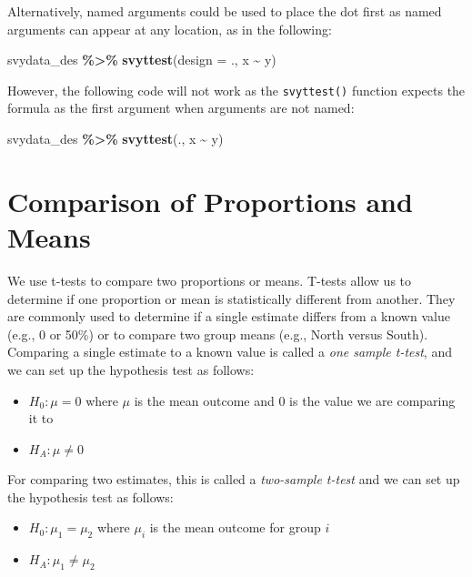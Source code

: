 \documentclass[
]{krantz}
\makeatletter
\newenvironment{Shaded}{\begin{snugshade}}{\end{snugshade}}
\newcommand{\AttributeTok}[1]{\textcolor[rgb]{0.27,0.27,0.27}{#1}}
\newcommand{\FunctionTok}[1]{\textcolor[rgb]{0.27,0.27,0.27}{\textbf{#1}}}
\newcommand{\NormalTok}[1]{#1}
\newcommand{\SpecialCharTok}[1]{\textcolor[rgb]{0.43,0.43,0.43}{\textbf{#1}}}
\providecommand{\tightlist}{%
  \setlength{\itemsep}{0pt}\setlength{\parskip}{0pt}}
\newenvironment{kframe}{%
\medskip{}
\setlength{\fboxsep}{.8em}
 \def\at@end@of@kframe{}%
 \ifinner\ifhmode%
  \def\at@end@of@kframe{\end{minipage}}%
  \begin{minipage}{\columnwidth}%
 \fi\fi%
 \def\FrameCommand##1{\hskip\@totalleftmargin \hskip-\fboxsep
 \colorbox{shadecolor}{##1}\hskip-\fboxsep
     \hskip-\linewidth \hskip-\@totalleftmargin \hskip\columnwidth}%
 \MakeFramed {\advance\hsize-\width
   \@totalleftmargin\z@ \linewidth\hsize
   \@setminipage}}%
 {\par\unskip\endMakeFramed%
 \at@end@of@kframe}
\renewenvironment{Shaded}{\begin{kframe}}{\end{kframe}}
\makeatother
\begin{document}
Alternatively, named arguments could be used to place the dot first as named arguments can appear at any location, as in the following:

\begin{Shaded}
\begin{Highlighting}[]
\NormalTok{svydata\_des }\SpecialCharTok{\%\textgreater{}\%}
 \FunctionTok{svyttest}\NormalTok{(}\AttributeTok{design =}\NormalTok{ ., x }\SpecialCharTok{\textasciitilde{}}\NormalTok{ y)}
\end{Highlighting}
\end{Shaded}

However, the following code will not work as the \texttt{svyttest()} function expects the formula as the first argument when arguments are not named:

\begin{Shaded}
\begin{Highlighting}[]
\NormalTok{svydata\_des }\SpecialCharTok{\%\textgreater{}\%}
 \FunctionTok{svyttest}\NormalTok{(., x }\SpecialCharTok{\textasciitilde{}}\NormalTok{ y)}
\end{Highlighting}
\end{Shaded}

\hypertarget{stattest-ttest}{%
\section{Comparison of Proportions and Means}\label{stattest-ttest}}

We use t-tests to compare two proportions or means. T-tests allow us to determine if one proportion or mean is statistically different from another. They are commonly used to determine if a single estimate differs from a known value (e.g., 0 or 50\%) or to compare two group means (e.g., North versus South). Comparing a single estimate to a known value is called a \emph{one sample t-test}, and we can set up the hypothesis test as follows:

\begin{itemize}
\tightlist
\item
  \(H_0: \mu = 0\) where \(\mu\) is the mean outcome and \(0\) is the value we are comparing it to
\item
  \(H_A: \mu \neq 0\)
\end{itemize}

For comparing two estimates, this is called a \emph{two-sample t-test} and we can set up the hypothesis test as follows:

\begin{itemize}
\tightlist
\item
  \(H_0: \mu_1 = \mu_2\) where \(\mu_i\) is the mean outcome for group \(i\)
\item
  \(H_A: \mu_1 \neq \mu_2\)
\end{itemize}
\end{document}
